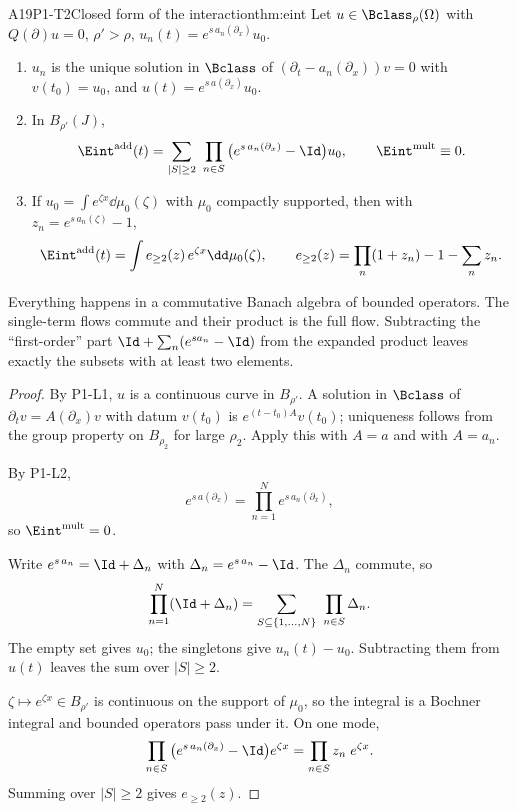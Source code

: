 \begin{dimcard}{A19}{P1-T2}{Closed form of the interaction}{\proved}{thm:eint}
Let $u\in\Bclass_\rho(\Omega)$ with $Q(\partial)u=0$, $\rho'>\rho$, $u_n(t)=e^{s\,a_n(\partial_x)}u_0$.
\begin{enumerate}[label=(\roman*)]
\item $u_n$ is the unique solution in $\Bclass$ of $(\partial_t-a_n(\partial_x))v=0$ with $v(t_0)=u_0$, and $u(t)=e^{s\,a(\partial_x)}u_0$.
\item In $B_{\rho'}(J)$,
\[
\Eint^{\mathrm{add}}(t)=\sum_{|S|\ge2}\ \prod_{n\in S}\big(e^{s\,a_n(\partial_x)}-\Id\big)u_0,\qquad \Eint^{\mathrm{mult}}\equiv0 .
\]
\item If $u_0=\int e^{\zeta x}\dd\mu_0(\zeta)$ with $\mu_0$ compactly supported, then with $z_n=e^{s\,a_n(\zeta)}-1$,
\[
\Eint^{\mathrm{add}}(t)=\int e_{\ge2}(z)\,e^{\zeta x}\dd\mu_0(\zeta),\qquad e_{\ge2}(z)=\prod_n(1+z_n)-1-\sum_nz_n .
\]
\end{enumerate}
\end{dimcard}

\begin{proofidea}
Everything happens in a commutative Banach algebra of bounded operators. The single-term flows commute and their product is the full flow. Subtracting the ``first-order'' part $\Id+\sum_n(e^{sa_n}-\Id)$ from the expanded product leaves exactly the subsets with at least two elements.
\end{proofidea}

\begin{proof}
By P1-L1, $u$ is a continuous curve in $B_{\rho'}$. A solution in $\Bclass$ of $\partial_tv=A(\partial_x)v$ with datum $v(t_0)$ is $e^{(t-t_0)A}v(t_0)$; uniqueness follows from the group property on $B_{\rho_2}$ for large $\rho_2$. Apply this with $A=a$ and with $A=a_n$.

By P1-L2,
\[
e^{s\,a(\partial_x)}=\prod_{n=1}^Ne^{s\,a_n(\partial_x)},
\]
so $\Eint^{\mathrm{mult}}=0$.

Write $e^{s\,a_n}=\Id+\Delta_n$ with $\Delta_n=e^{s\,a_n}-\Id$. The $\Delta_n$ commute, so
\[
\prod_{n=1}^N(\Id+\Delta_n)=\sum_{S\subseteq\{1,\dots,N\}}\ \prod_{n\in S}\Delta_n .
\]
The empty set gives $u_0$; the singletons give $u_n(t)-u_0$. Subtracting them from $u(t)$ leaves the sum over $|S|\ge2$.

$\zeta\mapsto e^{\zeta x}\in B_{\rho'}$ is continuous on the support of $\mu_0$, so the integral is a Bochner integral and bounded operators pass under it. On one mode,
\[
\prod_{n\in S}\big(e^{s\,a_n(\partial_x)}-\Id\big)e^{\zeta x}=\prod_{n\in S}z_n\;e^{\zeta x}.
\]
Summing over $|S|\ge2$ gives $e_{\ge2}(z)$.

\end{proof}

